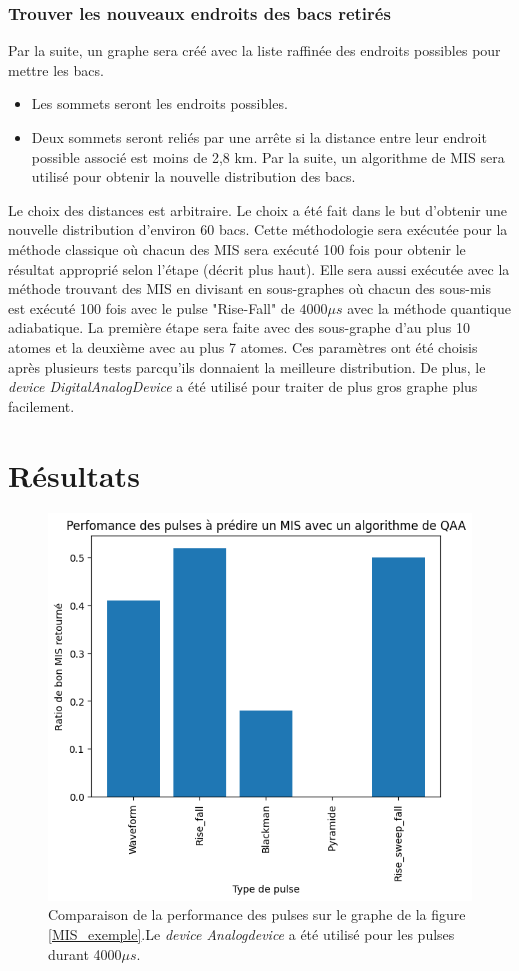\documentclass[11pt]{article}
\begin{document}
\subsubsection{Trouver les nouveaux endroits des bacs retirés}
Par la suite, un graphe sera créé avec la liste raffinée des endroits possibles pour mettre les bacs.
\begin{itemize}
    \item Les sommets seront les endroits possibles.
    \item Deux sommets seront reliés par une arrête si la distance entre leur endroit possible associé est moins de 2,8 km. Par la suite, un algorithme de MIS sera utilisé pour obtenir la nouvelle distribution des bacs.
\end{itemize}

Le choix des distances est arbitraire. Le choix a été fait dans le but d'obtenir une nouvelle distribution d'environ 60 bacs.
Cette méthodologie sera exécutée pour la méthode classique où chacun des MIS sera exécuté 100 fois pour obtenir le résultat approprié selon l'étape (décrit plus haut).
Elle sera aussi exécutée avec la méthode trouvant des MIS en divisant en sous-graphes où chacun des sous-mis est exécuté 100 fois avec le pulse  "Rise-Fall" de $4000 \mu s$ avec la méthode quantique adiabatique. La première étape sera faite avec des sous-graphe d'au plus 10 atomes et la deuxième avec au plus 7 atomes. Ces paramètres ont été choisis après plusieurs tests parcqu'ils donnaient la meilleure distribution. De plus, le \textit{device DigitalAnalogDevice} a été utilisé pour traiter de plus gros graphe plus facilement.



\section{Résultats}

\begin{figure}[H]
    \centering
    \includegraphics[width=0.49\linewidth]{images/pusle_comp.png}
    \caption{Comparaison de la performance des pulses sur le graphe de la figure \ref{MIS_exemple}.Le \textit{device Analogdevice} a été utilisé pour les pulses durant 4000$\mu s$.}
    \label{pulse_comp}
\end{figure}
\end{document}
